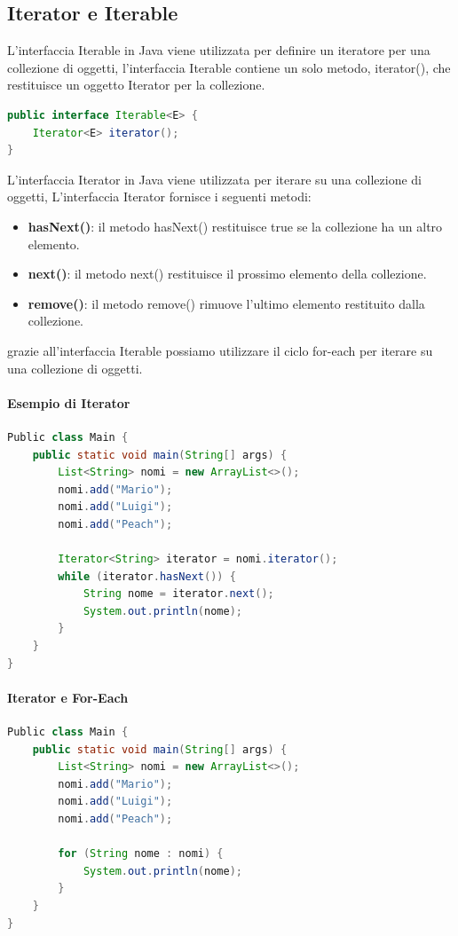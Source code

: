 \documentclass[11pt]{article}
\begin{document}
\subsection{Iterator e Iterable}
L'interfaccia Iterable in Java viene utilizzata per definire un iteratore per una collezione di oggetti,
l'interfaccia Iterable contiene un solo metodo, iterator(), che restituisce un oggetto Iterator per la collezione.
\begin{lstlisting}[language=Java]
public interface Iterable<E> {
    Iterator<E> iterator();
}
\end{lstlisting}
L'interfaccia Iterator in Java viene utilizzata per iterare su una collezione di oggetti,
L'interfaccia Iterator fornisce i seguenti metodi:
\begin{itemize}
    \item \textbf{hasNext()}: il metodo hasNext() restituisce true se la collezione ha un altro elemento.
    \item \textbf{next()}: il metodo next() restituisce il prossimo elemento della collezione.
    \item \textbf{remove()}: il metodo remove() rimuove l'ultimo elemento restituito dalla collezione.
    \end{itemize}
grazie all'interfaccia Iterable possiamo utilizzare il ciclo for-each per iterare su una collezione di oggetti.
\paragraph{Esempio di Iterator}
\begin{lstlisting}[language=Java]
Public class Main {
    public static void main(String[] args) {
        List<String> nomi = new ArrayList<>();
        nomi.add("Mario");
        nomi.add("Luigi");
        nomi.add("Peach");

        Iterator<String> iterator = nomi.iterator();
        while (iterator.hasNext()) {
            String nome = iterator.next();
            System.out.println(nome);
        }
    }
}
\end{lstlisting}
\paragraph{Iterator e For-Each}
\begin{lstlisting}[language=Java]
Public class Main {
    public static void main(String[] args) {
        List<String> nomi = new ArrayList<>();
        nomi.add("Mario");
        nomi.add("Luigi");
        nomi.add("Peach");

        for (String nome : nomi) {
            System.out.println(nome);
        }
    }
}
\end{lstlisting}
\end{document}
